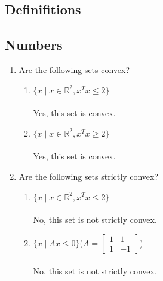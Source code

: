 \documentclass{assignment}
\date{}
\newcommand{\R}{\mathbb{R}}
\begin{document}
\begin{problem}
\section{Definifitions}

\subsection{Numbers}
\begin{enumerate}
\item Are the following sets convex?
\begin{enumerate}[label=\alph*)]
    \item \(\{x \mid x \in \R^2,x^Tx \leq2\}\)\\\\
    Yes, this set is convex.\\
    \item \(\{x \mid x \in \R^2,x^Tx \geq 2\}\)\\\\
    Yes, this set is convex.\\
\end{enumerate}
\item Are the following sets strictly convex?
\begin{enumerate}[label=\alph*)]
    \item \(\{x \mid x \in \R^2,x^Tx \leq2\}\)\\\\ No, this set is not strictly convex.\\
    \item \(\{x \mid Ax \leq 0\}\)($A = \begin{bmatrix}
        1&1\\1&-1
    \end{bmatrix}$)\\\\ No, this set is not strictly convex.\\\\
\end{enumerate}


\end{enumerate}
\end{problem}
\end{document}
